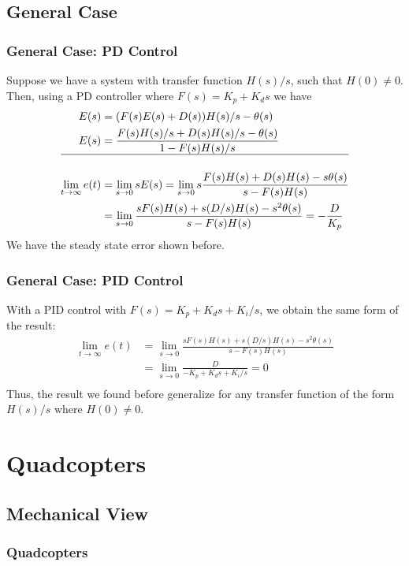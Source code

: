 \documentclass{beamer}
\begin{document}
\subsection{General Case}
\begin{frame}
    \frametitle{General Case: PD Control}
    Suppose we have a system with transfer function $H(s)/s$, such that $H(0) \ne 0$. Then, using a
    PD controller where $F(s) = K_p + K_d s$ we have
    \begin{align*}
        E(s) &= (F(s) E(s) + D(s)) H(s)/s - \theta(s) \\
        E(s) &= \frac{F(s)H(s)/s + D(s)H(s)/s - \theta(s)}{1-F(s)H(s)/s} \\
        \hline\\
        \lim_{t\to\infty} e(t) &= \lim_{s\to 0} s E(s)
        = \lim_{s\to 0} s\frac{F(s)H(s) + D(s)H(s) - s\theta(s)}{s-F(s)H(s)} \\
        &= \lim_{s\to 0} \frac{sF(s)H(s) + s(D/s)H(s) - s^2\theta(s)}{s-F(s)H(s)}
        = -\frac{D}{K_p} \\
    \end{align*}
    We have the steady state error shown before.
\end{frame}

\begin{frame}
    \frametitle{General Case: PID Control}
     With a PID control with $F(s) = K_p + K_d s + K_i/s$,
    we obtain the same form of the result:
    \begin{align*}
        \lim_{t\to\infty} e(t) &= \lim_{s\to 0} \frac{sF(s)H(s) + s(D/s)H(s) - s^2\theta(s)}{s-F(s)H(s)} \\
        &= \lim_{s\to 0} \frac{D}{-K_p + K_d s + K_i/s} = 0 \\
    \end{align*}
    Thus, the result we found before generalize for any transfer function of the form $H(s)/s$ where
    $H(0) \ne 0$.
\end{frame}

\section{Quadcopters}

\subsection{Mechanical View}
\begin{frame}
    \frametitle{Quadcopters}
    \begin{center}
         \\
    \end{center}
\end{frame}
\end{document}
